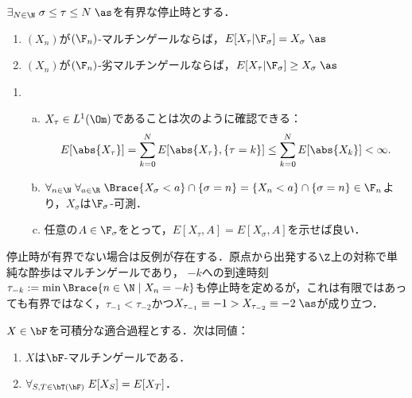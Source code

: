 \documentclass[uplatex,dvipdfmx]{jsreport}
\begin{document}
\begin{theorem}[有界停止時刻に於ける任意抽出]\label{thm-martingale-property-for-random-stopping-time}
    $\exists_{N\in\N}\;\sigma\le\tau\le N\;\as$を有界な停止時とする．
    \begin{enumerate}
        \item $(X_n)$が$(\F_n)$-マルチンゲールならば，$E[X_\tau|\F_\sigma]=X_\sigma\;\as$
        \item $(X_n)$が$(\F_n)$-劣マルチンゲールならば，$E[X_\tau|\F_\sigma]\ge X_\sigma\;\as$
    \end{enumerate}
\end{theorem}
\begin{Proof}\mbox{}
    \begin{enumerate}
        \item \begin{enumerate}[(a)]
            \item $X_\tau\in L^1(\Om)$であることは次のように確認できる：
            \[E[\abs{X_\tau}]=\sum^N_{k=0}E[\abs{X_\tau},\{\tau=k\}]\le\sum^N_{k=0}E[\abs{X_k}]<\infty.\]
            \item $\forall_{n\in\N}\;\forall_{a\in\R}\;\Brace{X_\sigma<a}\cap\{\sigma=n\}=\{X_n<a\}\cap\{\sigma=n\}\in\F_n$より，$X_\sigma$は$\F_\sigma$-可測．
            \item 任意の$A\in\F_\sigma$をとって，$E[X_\tau,A]=E[X_\sigma,A]$を示せば良い．
        \end{enumerate}
    \end{enumerate}
\end{Proof}
\begin{remark}[有界でない場合は極めて簡単な反例が存在する]
    停止時が有界でない場合は反例が存在する．原点から出発する$\Z$上の対称で単純な酔歩はマルチンゲールであり，
    $-k$への到達時刻$\tau_{-k}:=\min\Brace{n\in\N\mid X_n=-k}$も停止時を定めるが，これは有限ではあっても有界ではなく，$\tau_{-1}<\tau_{-2}$かつ$X_{\tau_{-1}}\equiv-1>X_{\tau_{-2}}\equiv-2\;\as$が成り立つ．
\end{remark}

\begin{corollary}[マルチンゲールの特徴付け]
    $X\in\bF$を可積分な適合過程とする．次は同値：
    \begin{enumerate}
        \item $X$は$\bF$-マルチンゲールである．
        \item $\forall_{S,T\in\bT(\bF)}\;E[X_S]=E[X_T]$．
    \end{enumerate}
\end{corollary}
\end{document}
